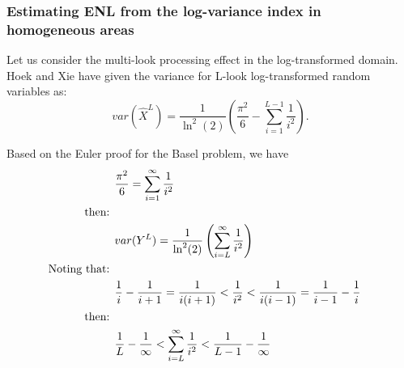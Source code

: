 \subsubsection{Estimating ENL from the log-variance index in homogeneous areas}
\label{sec:homogeneous_theoretical}


Let us consider the multi-look processing effect in the log-transformed domain. 
Hoek \cite{Hoekman_1991_TGRS} and Xie \cite{Xie_2002_TGRS} have given the variance for L-look log-transformed random 
variables as: 
\begin{equation*}
var(\hat{X}^L)= \frac{1}{\ln^2(2)} \left( \frac{\pi^2}{6} - \sum^{L-1}_{i=1}{\frac{1}{i^2}} \right).
\label{eqn:perf_index_theoretical}
\end{equation*}

Based on the Euler proof for the Basel problem, we have
\begin{align*}
&\frac{\pi^2}{6} = \sum^{\infty}_{i=1}{ \frac{1}{i^2} } &\\
\noindent \text{then: } \\ 
&var(Y^L) = \frac{1}{\ln^2(2)} \left( \sum^{\infty}_{i=L}{ \frac{1}{i^2} } \right) &\\
\noindent \text{Noting that: }  \\
&\frac{1}{i} - \frac{1}{i+1} = \frac{1}{i(i+1)} < \frac{1}{i^2} < \frac{1}{i(i-1)} = \frac{1}{i-1} - \frac{1}{i} &\\
\noindent \text{then: } \\
&\frac{1}{L} - \frac{1}{\infty} < \sum^{\infty}_{i=L}{ \frac{1}{i^2} }  < \frac{1}{L-1} - \frac{1}{\infty} &
\end{align*}

